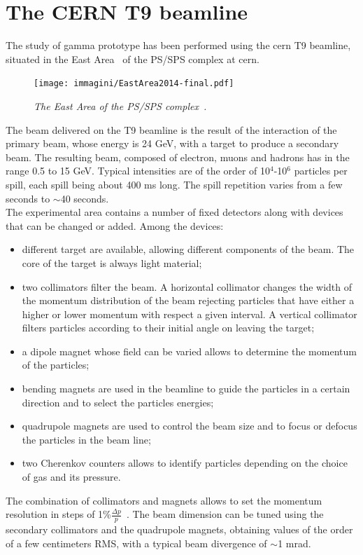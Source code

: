 \section{The CERN T9 beamline}\label{sec:T9}
The study of \gls{gamma} prototype has been performed using the \gls{cern} T9
beamline, situated in the East Area~ of the PS/SPS complex at \gls{cern}. 
\begin{figure}[!htb]
\centering
  \texttt{[image: immagini/EastArea2014-final.pdf]}
\caption{\small \it The East Area of the PS/SPS
  complex~\cite{cern_east}.}\label{fig:cern_east} %
\end{figure}
The beam delivered on the T9 beamline is the result of the interaction of the
primary beam, whose energy is 24 GeV, with a target to produce a secondary
beam. The resulting beam, composed of electron, muons and hadrons has in the
range 0.5 to 15 GeV. Typical intensities are of the order of 10$^4$-10$^6$ particles
per spill, each spill being about 400 ms long. The spill repetition varies from a few
seconds to $\sim$40 seconds.\\
The experimental area contains a number of fixed detectors along with devices
that can be changed or added. Among the devices:
\begin{itemize}
\item different target are available, allowing different components of the
  beam. The core of the target is always light material;
\item two collimators filter the beam. A horizontal collimator changes the
  width of the momentum distribution of the beam rejecting particles that have
  either a higher or lower momentum with respect a given interval. A vertical
  collimator filters particles according to their initial angle on leaving the
  target;
\item a dipole magnet whose field can be varied allows to determine the momentum
  of the particles;
\item bending magnets are used in the beamline to guide the particles in a
  certain direction and to select the particles energies;
\item quadrupole magnets are used to control the beam size and to focus or
  defocus the particles in the beam line;
\item two Cherenkov counters allows to identify particles depending on the
  choice of gas and its pressure.
\end{itemize}
The combination of collimators and magnets allows to set the momentum resolution
in steps of 1\%$\frac{\Delta p}{p}$~\cite{muller2001optics}. The beam dimension
can be tuned using the secondary collimators and the quadrupole magnets,
obtaining values of the order of a few centimeters RMS, with a typical beam
divergence of $\sim$1 mrad.

